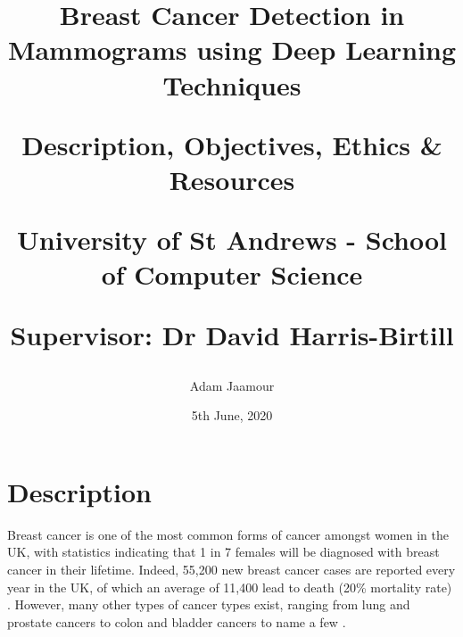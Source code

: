 \documentclass[letterpaper,12pt]{article}
\begin{document}
\title{
    Breast Cancer Detection in Mammograms using Deep Learning Techniques\\
    \vspace*{1cm}
    \begin{Large}
    Description, Objectives, Ethics \& Resources\\
    \end{Large}
    \vspace*{1cm}
    \begin{large}
    University of St Andrews - School of Computer Science\\
    \end{large}
    \begin{large}
    Supervisor: Dr David Harris-Birtill
    \end{large}
    \vspace*{0.5cm}
}
\author{Adam Jaamour} %
\date{5th June, 2020}
\maketitle
\newpage


\section{Description}
\label{sec:description}

Breast cancer is one of the most common forms of cancer amongst women in the UK, with statistics indicating that 1 in 7 females will be diagnosed with breast cancer in their lifetime. Indeed, 55,200 new breast cancer cases are reported every year in the UK, of which an average of 11,400 lead to death (20\% mortality rate) \cite{BreastCancerResearchUK}. However, many other types of cancer types exist, ranging from lung and prostate cancers to colon and bladder cancers to name a few \cite{cokkinides2005american}.\\
\end{document}
